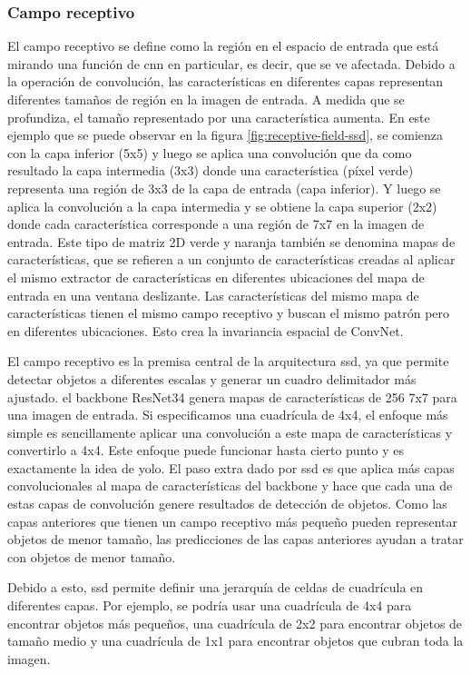 \subsubsection*{Campo receptivo}
\label{subsubsec:receptive-field-ssd}

El campo receptivo se define como la región en el espacio de entrada que está mirando una función de \gls{cnn} en particular, es decir, que se ve afectada. Debido a la operación de convolución, las características en diferentes capas representan diferentes tamaños de región en la imagen de entrada. A medida que se profundiza, el tamaño representado por una característica aumenta. En este ejemplo que se puede observar en la figura \ref{fig:receptive-field-ssd}, se comienza con la capa inferior (5x5) y luego se aplica una convolución que da como resultado la capa intermedia (3x3) donde una característica (píxel verde) representa una región de 3x3 de la capa de entrada (capa inferior). Y luego se aplica la convolución a la capa intermedia y se obtiene la capa superior (2x2) donde cada característica corresponde a una región de 7x7 en la imagen de entrada. Este tipo de matriz 2D verde y naranja también se denomina mapas de características, que se refieren a un conjunto de características creadas al aplicar el mismo extractor de características en diferentes ubicaciones del mapa de entrada en una ventana deslizante. Las características del mismo mapa de características tienen el mismo campo receptivo y buscan el mismo patrón pero en diferentes ubicaciones. Esto crea la invariancia espacial de ConvNet.

El campo receptivo es la premisa central de la arquitectura \gls{ssd}, ya que permite detectar objetos a diferentes escalas y generar un cuadro delimitador más ajustado. el backbone ResNet34 genera mapas de características de 256 7x7 para una imagen de entrada. Si especificamos una cuadrícula de 4x4, el enfoque más simple es sencillamente aplicar una convolución a este mapa de características y convertirlo a 4x4. Este enfoque puede funcionar hasta cierto punto y es exactamente la idea de \gls{yolo}. El paso extra dado por \gls{ssd} es que aplica más capas convolucionales al mapa de características del backbone y hace que cada una de estas capas de convolución genere resultados de detección de objetos. Como las capas anteriores que tienen un campo receptivo más pequeño pueden representar objetos de menor tamaño, las predicciones de las capas anteriores ayudan a tratar con objetos de menor tamaño.

Debido a esto, \gls{ssd} permite definir una jerarquía de celdas de cuadrícula en diferentes capas. Por ejemplo, se podría usar una cuadrícula de 4x4 para encontrar objetos más pequeños, una cuadrícula de 2x2 para encontrar objetos de tamaño medio y una cuadrícula de 1x1 para encontrar objetos que cubran toda la imagen.

